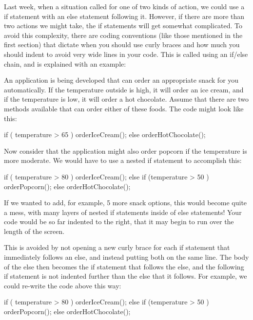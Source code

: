 Last week, when a situation called for one of two kinds of action, we could use a if statement with an else statement following it. However, if there are more than two actions we might take, the if statements will get somewhat complicated. To avoid this complexity, there are coding conventions (like those mentioned in the first section) that dictate when you should use curly braces and how much you should indent to avoid very wide lines in your code. This is called using an if/else chain, and is explained with an example:

\begin{exa}
An application is being developed that can order an appropriate snack for you automatically. If the temperature outside is high, it will order an ice cream, and if the temperature is low, it will order a hot chocolate. Assume that there are two methods available that can order either of these foods. The code might look like this:

\begin{code}
if ( temperature > 65 ) {
  orderIceCream();
} else {
  orderHotChocolate();
}
\end{code}

Now consider that the application might also order popcorn if the temperature is more moderate. We would have to use a nested if statement to accomplish this:

\begin{code}
if ( temperature > 80 ) {
  orderIceCream();
} else {
  if (temperature > 50 ) {
    orderPopcorn();
  } else {
    orderHotChocolate();
  }
}
\end{code}

If we wanted to add, for example, 5 more snack options, this would become quite a mess, with many layers of nested if statements inside of else statements! Your code would be so far indented to the right, that it may begin to run over the length of the screen. 

This is avoided by not opening a new curly brace for each if statement that immediately follows an else, and instead putting both on the same line. The body of the else then becomes the if statement that follows the else, and the following if statement is not indented further than the else that it follows. For example, we could re-write the code above this way:

\begin{code}
if ( temperature > 80 ) {
  orderIceCream();
} else if (temperature > 50 ) {
  orderPopcorn();
} else {
    orderHotChocolate();
}
\end{code}

\end{exa}

